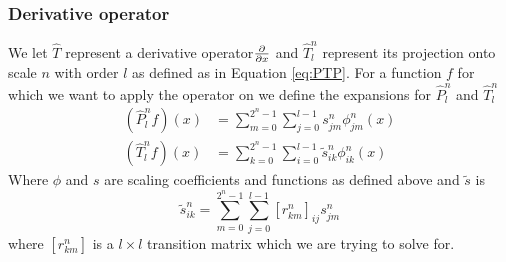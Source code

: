 \documentclass[../master_thesis.tex]{subfiles}
\begin{document}
\subsubsection{Derivative operator}
We let $\hat{T}$ represent a derivative operator$\frac{\partial}{\partial x}$ and  $\hat{T}^n_{l}$
represent its projection onto scale $n$ with order $l$ as defined as in Equation
\ref{eq:PTP}. For a function $f$ for which we want to apply the operator on we
define the expansions for $\hat{P}^n_l$ and $\hat{T}^n_{l}$ \cite{Beylkin1999AdaptiveSO}
\begin{equation}
  \begin{aligned}
    \left(\hat{P}^{n}_{l} f\right)(x) &=\sum_{m=0}^{2^{n}-1} \sum_{j=0}^{l-1} s_{j m}^{n} \phi_{j m}^{n}(x) \\
    \left(\hat{T}^{n}_{l} f\right)(x) &=\sum_{k=0}^{2^{n}-1} \sum_{i=0}^{l-1} \tilde{s}_{i k}^{n} \phi_{i k}^{n}(x)
  \end{aligned}
\end{equation}
Where $\phi$ and $s$ are scaling coefficients and functions as defined above and $\tilde{s}$ is
\begin{equation}\label{eq:scalingdiff}
\tilde{s}_{i k}^{n}=\sum_{m=0}^{2^{n}-1} \sum_{j=0}^{l-1}\left[r_{k m}^{n}\right]_{i j} s_{j m}^{n}
\end{equation}
where $\left[r_{k m}^{n}\right]$ is a $l\times l$ transition matrix which we are
trying to solve for.
\end{document}
